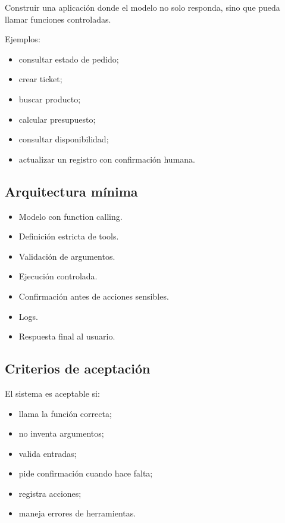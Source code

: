 Construir una aplicación donde el modelo no solo responda, sino que
pueda llamar funciones controladas.

Ejemplos:

\begin{itemize}
\tightlist
\item
  consultar estado de pedido;
\item
  crear ticket;
\item
  buscar producto;
\item
  calcular presupuesto;
\item
  consultar disponibilidad;
\item
  actualizar un registro con confirmación humana.
\end{itemize}

\subsection{Arquitectura mínima}\label{arquitectura-muxednima-5}

\begin{itemize}
\tightlist
\item
  Modelo con function calling.
\item
  Definición estricta de tools.
\item
  Validación de argumentos.
\item
  Ejecución controlada.
\item
  Confirmación antes de acciones sensibles.
\item
  Logs.
\item
  Respuesta final al usuario.
\end{itemize}

\subsection{Criterios de aceptación}\label{criterios-de-aceptaciuxf3n-4}

El sistema es aceptable si:

\begin{itemize}
\tightlist
\item
  llama la función correcta;
\item
  no inventa argumentos;
\item
  valida entradas;
\item
  pide confirmación cuando hace falta;
\item
  registra acciones;
\item
  maneja errores de herramientas.
\end{itemize}

